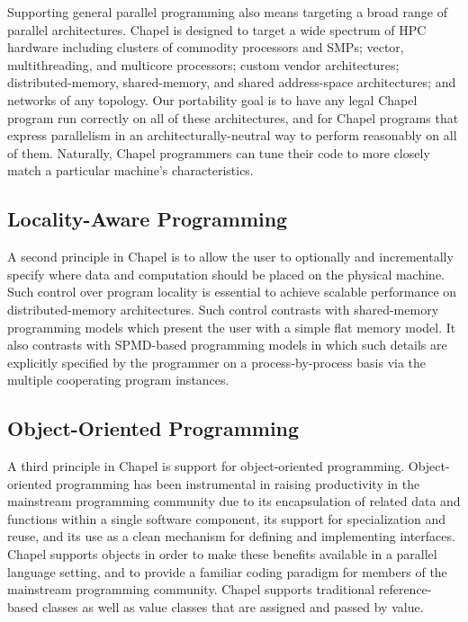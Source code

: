 Supporting general parallel programming also means targeting a broad
range of parallel architectures.  Chapel is designed to target a wide
spectrum of HPC hardware including clusters of commodity processors
and SMPs; vector, multithreading, and multicore processors; custom
vendor architectures; distributed-memory, shared-memory, and 
shared address-space architectures; and networks of any topology.  Our
portability goal is to have any legal Chapel program run correctly on
all of these architectures, and for Chapel programs that express
parallelism in an architecturally-neutral way to perform reasonably on
all of them.  Naturally, Chapel programmers can tune their code to
more closely match a particular machine's characteristics.

\subsection{Locality-Aware Programming}
\label{Locality_Aware_Programming}

A second principle in Chapel is to allow the user to optionally and
incrementally specify where data and computation should be placed on
the physical machine.  Such control over program locality is essential
to achieve scalable performance on distributed-memory architectures.  Such control
contrasts with shared-memory programming models which present the user
with a simple flat memory model.  It also contrasts with SPMD-based
programming models in which such details are explicitly specified by
the programmer on a process-by-process basis via the multiple
cooperating program instances.

\subsection{Object-Oriented Programming}
\label{Object_Oriented_Programming}

A third principle in Chapel is support for object-oriented
programming.  Object-oriented programming has been instrumental in
raising productivity in the mainstream programming community due to
its encapsulation of related data and functions within a single software
component, its support for specialization and reuse, and its use as a
clean mechanism for defining and implementing interfaces.  Chapel
supports objects in order to make these benefits available in a
parallel language setting, and to provide a familiar coding paradigm for
members of the mainstream programming community.  Chapel supports
traditional reference-based classes as well as value classes that are
assigned and passed by value.


